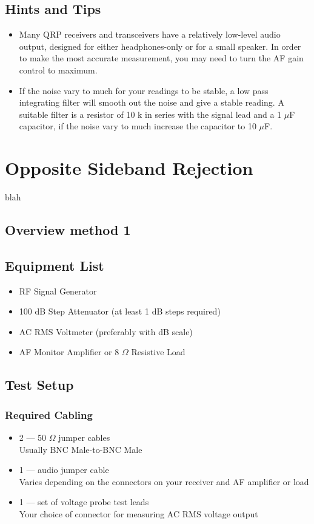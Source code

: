 \documentclass[10pt,letterpaper]{book}
\begin{document}
\subsection*{Hints and Tips}
\begin{itemize}
	\item Many QRP receivers and transceivers have a relatively low-level audio output, designed for either headphones-only or for a small speaker. In order to make the most accurate measurement, you may need to turn the AF gain control to maximum.
	\item If the noise vary to much for your readings to be stable, a low pass integrating filter will smooth out the noise and give a stable reading. A suitable filter is a resistor of 10 k in series with the signal lead and a 1 $\mu$F capacitor, if the noise vary to much increase the capacitor to 10 $\mu$F.  
	
\end{itemize}
\newpage

\section{Opposite Sideband Rejection}
blah
\subsection*{Overview method 1}
\subsection*{Equipment List}
\begin{itemize}
	\item RF Signal Generator
	\item 100 dB Step Attenuator (at least 1 dB steps required)
	\item AC RMS Voltmeter (preferably with dB scale)
	\item AF Monitor Amplifier or 8 $\Omega$ Resistive Load
\end{itemize}
\subsection*{Test Setup}
\subsubsection*{Required Cabling}
\begin{itemize}
	\item 2 --- 50 $\Omega$ jumper cables \\
		Usually BNC Male-to-BNC Male
	\item 1 --- audio jumper cable \\
		Varies depending on the connectors on your receiver and AF amplifier or load
	\item 1 --- set of voltage probe test leads \\
		Your choice of connector for measuring AC RMS voltage output
\end{itemize}
\end{document}

